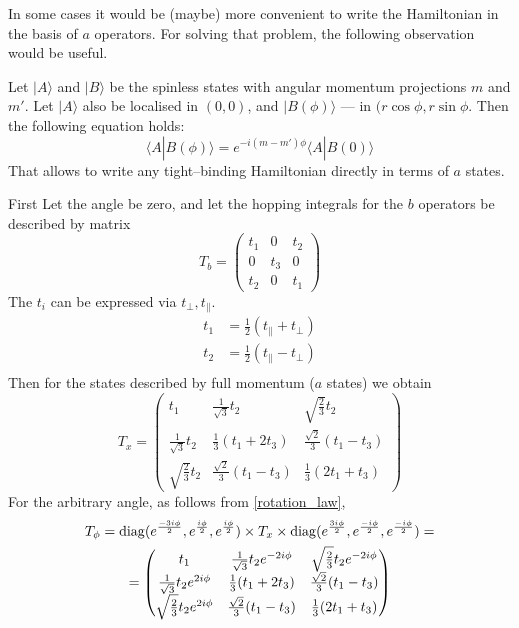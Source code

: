 In some cases it would be (maybe) more convenient to write the Hamiltonian in the basis 
of $a$ operators. For solving that problem, the following observation would be useful.

Let $|A\rangle$ and $|B\rangle$ be the spinless states with angular momentum projections $m$ and $m'$.
Let $|A\rangle$ also be localised in $(0,0)$, and $|B(\phi)\rangle$ --- in $(r\cos{\phi}, 
r\sin{\phi}$. Then the following equation holds:
\begin{equation}
	\label{rotation_law}
	\langle A | B(\phi) \rangle = e^{-i(m-m')\phi}\langle A | B(0) \rangle
\end{equation}
That allows to write any tight--binding Hamiltonian directly in terms of $a$ states.

First Let the angle be zero, and
let the hopping integrals for the $b$ operators be described by matrix
\begin{equation}
	T_b = \left(\begin{matrix}
			t_1 & 0 & t_2 \\
			0 & t_3 & 0 \\
			t_2 & 0 & t_1
		\end{matrix}\right)
\end{equation}
The $t_i$ can be expressed via $t_{\perp}, t_{\parallel}$. 
\begin{equation}
	\begin{split}
		t_1& = \frac 12 \left(t_{\parallel} + t_{\perp}\right)\\
		t_2& = \frac 12 \left(t_{\parallel} - t_{\perp}\right)\\
	\end{split}
\end{equation}
Then for the states described by full momentum ($a$ states) we obtain
\begin{equation}
	T_x = \left(\begin{matrix}
		t_1 & \frac{1}{\sqrt{3}} t_2 & \sqrt{\frac 23} t_2 \\
		\frac{1}{\sqrt{3}}t_2 & \frac{1}{3}(t_1 + 2t_3) &\frac{\sqrt{2}}{3}(t_1 - t_3)\\
		\sqrt{\frac 23}t_2 & \frac{\sqrt{2}}{3} (t_1 - t_3) & \frac{1}{3}(2t_1 + t_3) 
		\end{matrix} \right) 
\end{equation}
For the arbitrary angle, as follows from \ref{rotation_law}, 
\begin{multline}
	T_{\phi} = \operatorname{diag}(e^{\frac{-3i\phi}{2}},e^{\frac{i\phi}{2}},e^{\frac{i\phi}{2}})
				\times T_x 
				\times \operatorname{diag}(e^{\frac{3i\phi}{2}}, e^{\frac{-i\phi}{2}},e^{\frac{-i\phi}{2}}) =\\
	 =	\left(\begin{matrix}
		t_1 & \frac{1}{\sqrt{3}} t_2 e^{-2i\phi} & \sqrt{\frac 23} t_2e^{-2i\phi}  \\
		\frac{1}{\sqrt{3}}t_2 e^{2i\phi} & \frac{1}{3}(t_1 + 2t_3) 
														&\frac{\sqrt{2}}{3}(t_1 - t_3)\\
		\sqrt{\frac 23}t_2e^{2i\phi} &\frac{\sqrt{2}}{3} (t_1 - t_3) &\frac{1}{3}(2t_1 + t_3) 
		\end{matrix} \right) 
\end{multline}
